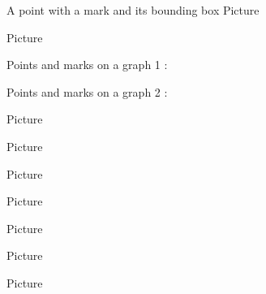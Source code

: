 A point with a mark and its bounding box
Picture 
\Huge

\begin{center}
   
\end{center}
\normalsize



Picture 
\begin{center}

\end{center}


Points and marks on a graph 1 :

\begin{center}

\end{center}


Points and marks on a graph 2 :

Picture 
\begin{center}

\end{center}


Picture 
\begin{center}

\end{center}


Picture 
\begin{center}
   
\end{center}
   

Picture 
\begin{center}
   
\end{center}



Picture 
\begin{center}

\end{center}


Picture 
\begin{center}
   
\end{center}


Picture 
\begin{center}
   
\end{center}


